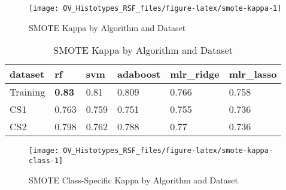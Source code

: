 \documentclass[
]{report}
\begin{document}
\begin{figure}[H]

{\centering \texttt{[image: OV\_Histotypes\_RSF\_files/figure-latex/smote-kappa-1]} 

}

\caption{SMOTE Kappa by Algorithm and Dataset}\label{fig:smote-kappa}
\end{figure}

\begin{table}

\caption{\label{tab:smote-kappa-table}SMOTE Kappa by Algorithm and Dataset}
\centering
\begin{tabular}[t]{l|l|l|l|l|l}
\hline
dataset & rf & svm & adaboost & mlr\_ridge & mlr\_lasso\\
\hline
Training & \textbf{0.83} & 0.81 & 0.809 & 0.766 & 0.758\\
\hline
CS1 & 0.763 & 0.759 & 0.751 & 0.755 & 0.736\\
\hline
CS2 & 0.798 & 0.762 & 0.788 & 0.77 & 0.736\\
\hline
\end{tabular}
\end{table}

\begin{figure}[H]

{\centering \texttt{[image: OV\_Histotypes\_RSF\_files/figure-latex/smote-kappa-class-1]} 

}

\caption{SMOTE Class-Specific Kappa by Algorithm and Dataset}\label{fig:smote-kappa-class}
\end{figure}

  
\end{document}
